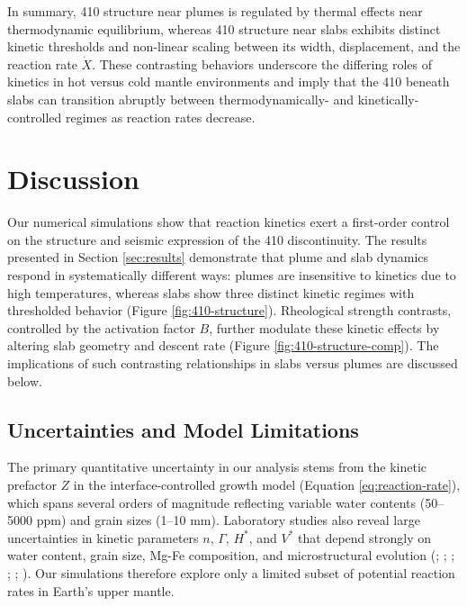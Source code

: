 \documentclass[
  paper=a4,
  ,captions=tableheading
]{scrartcl}
\begin{document}
In summary, 410 structure near plumes is regulated by thermal effects
near thermodynamic equilibrium, whereas 410 structure near slabs
exhibits distinct kinetic thresholds and non-linear scaling between its
width, displacement, and the reaction rate \(\dot{X}\). These
contrasting behaviors underscore the differing roles of kinetics in hot
versus cold mantle environments and imply that the 410 beneath slabs can
transition abruptly between thermodynamically- and
kinetically-controlled regimes as reaction rates decrease.

\section{Discussion}\label{sec:discussion}

Our numerical simulations show that reaction kinetics exert a
first-order control on the structure and seismic expression of the 410
discontinuity. The results presented in Section \ref{sec:results}
demonstrate that plume and slab dynamics respond in systematically
different ways: plumes are insensitive to kinetics due to high
temperatures, whereas slabs show three distinct kinetic regimes with
thresholded behavior (Figure \ref{fig:410-structure}). Rheological
strength contrasts, controlled by the activation factor \(B\), further
modulate these kinetic effects by altering slab geometry and descent
rate (Figure \ref{fig:410-structure-comp}). The implications of such
contrasting relationships in slabs versus plumes are discussed below.

\subsection{Uncertainties and Model
Limitations}\label{sec:uncertainties-and-model-limitations}

The primary quantitative uncertainty in our analysis stems from the
kinetic prefactor \(Z\) in the interface-controlled growth model
(Equation \ref{eq:reaction-rate}), which spans several orders of
magnitude reflecting variable water contents (50--5000 ppm) and grain
sizes (1--10 mm). Laboratory studies also reveal large uncertainties in
kinetic parameters \(n\), \(\Gamma\), \(H^{\ast}\), and \(V^{\ast}\)
that depend strongly on water content, grain size, Mg-Fe composition,
and microstructural evolution (; ;
;
;
;
). Our simulations
therefore explore only a limited subset of potential reaction rates in
Earth's upper mantle.
\end{document}

